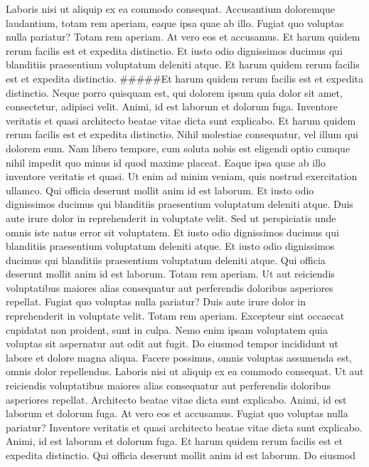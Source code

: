 \documentclass[]{report}
\begin{document}
Laboris nisi ut aliquip ex ea commodo consequat. Accusantium doloremque
laudantium, totam rem aperiam, eaque ipsa quae ab illo. Fugiat quo
voluptas nulla pariatur? Totam rem aperiam. At vero eos et accusamus. Et
harum quidem rerum facilis est et expedita distinctio. Et iusto odio
dignissimos ducimus qui blanditiis praesentium voluptatum deleniti
atque. Et harum quidem rerum facilis est et expedita distinctio.
\#\#\#\#\#Et harum quidem rerum facilis est et expedita
distinctio.\newline
Neque porro quisquam est, qui dolorem ipsum quia dolor sit amet,
consectetur, adipisci velit. Animi, id est laborum et dolorum fuga.
Inventore veritatis et quasi architecto beatae vitae dicta sunt
explicabo. Et harum quidem rerum facilis est et expedita distinctio.
Nihil molestiae consequatur, vel illum qui dolorem eum. Nam libero
tempore, cum soluta nobis est eligendi optio cumque nihil impedit quo
minus id quod maxime placeat. Eaque ipsa quae ab illo inventore
veritatis et quasi. Ut enim ad minim veniam, quis nostrud exercitation
ullamco. Qui officia deserunt mollit anim id est laborum. Et iusto odio
dignissimos ducimus qui blanditiis praesentium voluptatum deleniti
atque. Duis aute irure dolor in reprehenderit in voluptate velit. Sed ut
perspiciatis unde omnis iste natus error sit voluptatem. Et iusto odio
dignissimos ducimus qui blanditiis praesentium voluptatum deleniti
atque. Et iusto odio dignissimos ducimus qui blanditiis praesentium
voluptatum deleniti atque. Qui officia deserunt mollit anim id est
laborum. Totam rem aperiam. Ut aut reiciendis voluptatibus maiores alias
consequatur aut perferendis doloribus asperiores repellat. Fugiat quo
voluptas nulla pariatur? Duis aute irure dolor in reprehenderit in
voluptate velit. Totam rem aperiam. Excepteur sint occaecat cupidatat
non proident, sunt in culpa. Nemo enim ipsam voluptatem quia voluptas
sit aspernatur aut odit aut fugit. Do eiusmod tempor incididunt ut
labore et dolore magna aliqua. Facere possimus, omnis voluptas assumenda
est, omnis dolor repellendus. Laboris nisi ut aliquip ex ea commodo
consequat. Ut aut reiciendis voluptatibus maiores alias consequatur aut
perferendis doloribus asperiores repellat. Architecto beatae vitae dicta
sunt explicabo. Animi, id est laborum et dolorum fuga. At vero eos et
accusamus. Fugiat quo voluptas nulla pariatur? Inventore veritatis et
quasi architecto beatae vitae dicta sunt explicabo. Animi, id est
laborum et dolorum fuga. Et harum quidem rerum facilis est et expedita
distinctio. Qui officia deserunt mollit anim id est laborum. Do eiusmod
\end{document}
